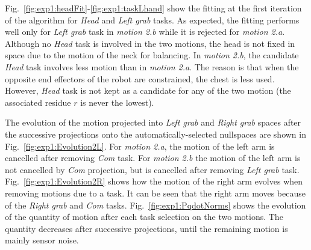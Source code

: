 \documentclass[journal]{IEEEtran}
\begin{document}
Fig.~\ref{fig:exp1:headFit}-\ref{fig:exp1:taskLhand} show the
fitting at the first iteration of the algorithm for \emph{Head} and \emph{Left grab} tasks. As expected,
the fitting performs well only for \emph{Left grab} task in \emph{motion 2.b} while it is rejected for
\emph{motion 2.a}.
Although no \emph{Head} task is involved in the two motions, the head is not
fixed in space due to the motion of the neck for balancing.
In \emph{motion 2.b}, the candidate \emph{Head} task involves less motion
than in \emph{motion 2.a}. The reason is that when the opposite end effectors
of the robot are constrained, the chest is less used.
However, \emph{Head} task is not kept as a candidate for any of the two motion (the associated residue $r$ is never the lowest).

The evolution of the motion projected into \emph{Left grab} and \emph{Right grab}
spaces after the successive projections onto the automatically-selected nullspaces
are shown in Fig.~\ref{fig:exp1:Evolution2L}. For \emph{motion 2.a},
the motion of the left arm is cancelled after removing \emph{Com} task.
For \emph{motion 2.b} the motion of the left arm is
not cancelled by \emph{Com} projection, but is cancelled after
removing \emph{Left grab} task.
Fig.~\ref{fig:exp1:Evolution2R} shows how the motion of the right arm evolves when removing
motions due to a task. It can be seen that the right arm moves because of the \emph{Right grab} and
\emph{Com} tasks.
Fig.~\ref{fig:exp1:PqdotNorms} shows the evolution of the quantity of motion after each task selection
on the two motions. The quantity decreases after successive projections, until the remaining motion
is mainly sensor noise.
\end{document}
